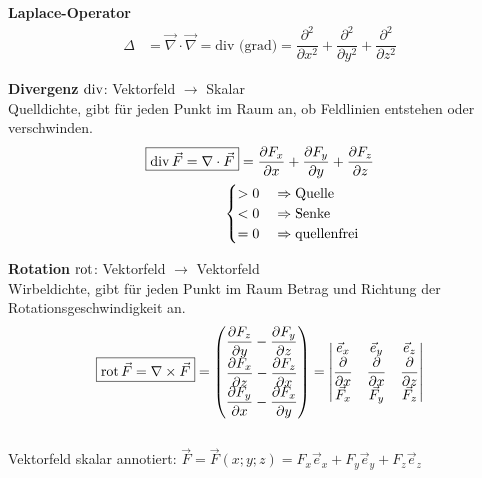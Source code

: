 \textbf{Laplace-Operator}
\begin{align*}
    \varDelta  & = \vec{\nabla} \cdot \vec{\nabla} = \textrm{div (grad)} = 
    \dfrac{\partial ^2}{\partial x^2}+\dfrac{\partial ^2}{\partial y^2}+\dfrac{\partial ^2}{\partial z^2}
\end{align*}

\textbf{Divergenz} $\operatorname{div}$: Vektorfeld $\rightarrow$ Skalar\\
\small{Quelldichte, gibt für jeden Punkt im Raum an, ob Feldlinien entstehen oder verschwinden.}
\begin{align*}
    \boxed{\operatorname{div} \vec{F} = \nabla \cdot \vec{F}}   =  \dfrac{\partial F_x}{\partial x} 
    + \dfrac{\partial F_y}{\partial y} + \dfrac{\partial F_z}{\partial z}\\ 
                                 \begin{cases}
    > 0 \quad\Rightarrow \textnormal{Quelle}  \\
    < 0 \quad\Rightarrow \textnormal{Senke} \\
    = 0 \quad\Rightarrow \textnormal{quellenfrei} 
\end{cases}                                      
\end{align*}

\textbf{Rotation} $\operatorname{rot}$: Vektorfeld $\rightarrow$ Vektorfeld\\ 
\small{Wirbeldichte, gibt für jeden Punkt im Raum Betrag und Richtung der Rotationsgeschwindigkeit an.}
\begin{align*}
\boxed{\operatorname{rot} \vec{F} = \nabla \times \vec{F} } = 
\begin{pmatrix}
    \dfrac{\partial F_z}{\partial y} - \dfrac{\partial F_y}{\partial z} \\
    \dfrac{\partial F_x}{\partial z} - \dfrac{\partial F_z}{\partial x} \\
    \dfrac{\partial F_y}{\partial x} - \dfrac{\partial F_x}{\partial y}
\end{pmatrix} =
\begin{vmatrix}
    \vec{e}_x & \vec{e}_y & \vec{e}_z \\
    \dfrac{\partial}{\partial x} & \dfrac{\partial }{\partial x} & \dfrac{\partial }{\partial z} \\
    \vec{F}_x & \vec{F}_y & \vec{F}_z
\end{vmatrix}
\end{align*}\\
Vektorfeld skalar annotiert: $\vec{F} = \vec{F}(x;y;z) = F_x\vec{e}_x+F_y\vec{e}_y+F_z\vec{e}_z$

